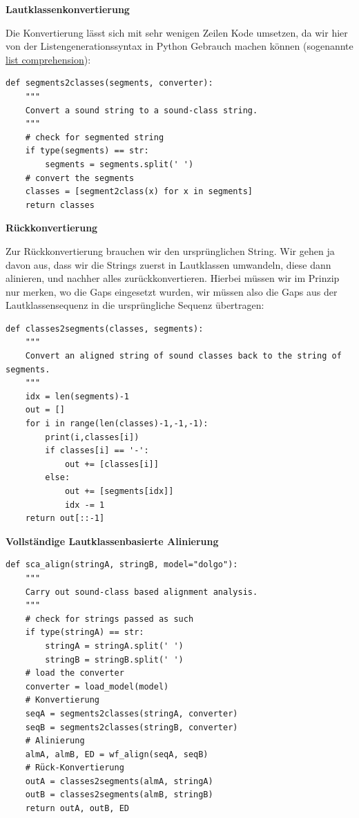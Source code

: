 \par\noindent\textbf{Lautklassenkonvertierung}

Die Konvertierung lässt sich mit sehr wenigen Zeilen Kode umsetzen, da
wir hier von der Listengenerationssyntax in Python Gebrauch machen
können (sogenannte
\href{http://www.secnetix.de/olli/Python/list_comprehensions.hawk}{list
comprehension}):

\begin{verbatim}
def segments2classes(segments, converter):
    """
    Convert a sound string to a sound-class string.
    """
    # check for segmented string
    if type(segments) == str:
        segments = segments.split(' ')
    # convert the segments
    classes = [segment2class(x) for x in segments]
    return classes
\end{verbatim}





\par\noindent\textbf{Rückkonvertierung}

Zur Rückkonvertierung brauchen wir den ursprünglichen String. Wir gehen
ja davon aus, dass wir die Strings zuerst in Lautklassen umwandeln,
diese dann alinieren, und nachher alles zurückkonvertieren. Hierbei
müssen wir im Prinzip nur merken, wo die Gaps eingesetzt wurden, wir
müssen also die Gaps aus der Lautklassensequenz in die ursprüngliche
Sequenz übertragen:

\begin{verbatim}
def classes2segments(classes, segments):
    """
    Convert an aligned string of sound classes back to the string of segments.
    """
    idx = len(segments)-1
    out = []
    for i in range(len(classes)-1,-1,-1):
        print(i,classes[i])
        if classes[i] == '-':
            out += [classes[i]]
        else:
            out += [segments[idx]]
            idx -= 1  
    return out[::-1] 
\end{verbatim}





\par\noindent\textbf{Vollständige Lautklassenbasierte Alinierung}

\begin{verbatim}
def sca_align(stringA, stringB, model="dolgo"):
    """
    Carry out sound-class based alignment analysis.
    """
    # check for strings passed as such 
    if type(stringA) == str:
        stringA = stringA.split(' ')
        stringB = stringB.split(' ')
    # load the converter
    converter = load_model(model)
    # Konvertierung
    seqA = segments2classes(stringA, converter)
    seqB = segments2classes(stringB, converter)
    # Alinierung
    almA, almB, ED = wf_align(seqA, seqB)
    # Rück-Konvertierung
    outA = classes2segments(almA, stringA)
    outB = classes2segments(almB, stringB)
    return outA, outB, ED
\end{verbatim}


